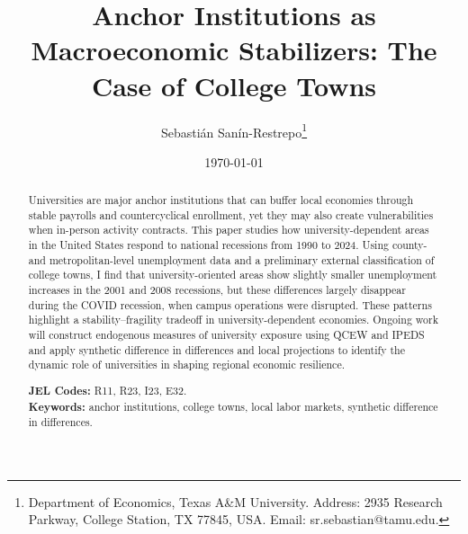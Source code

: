


\title{\Large \textbf{Anchor Institutions as Macroeconomic Stabilizers: The Case of College Towns}}

\author{Sebasti\'an San\'in-Restrepo\thanks{Department of Economics, Texas A\&M University. Address: 2935 Research Parkway, College Station, TX 77845, USA. Email: sr.sebastian@tamu.edu.}} 
\date{\today}

\maketitle
\thispagestyle{empty} 
\doublespacing
\thispagestyle{empty} 

\vspace{-10mm}
\renewcommand{\abstractname}{Abstract}
\begin{abstract} 
	\normalsize 
	\vspace{-5mm}
	
	\noindent Universities are major anchor institutions that can buffer local economies through stable payrolls and countercyclical enrollment, yet they may also create vulnerabilities when in-person activity contracts. This paper studies how university-dependent areas in the United States respond to national recessions from 1990 to 2024. Using county- and metropolitan-level unemployment data and a preliminary external classification of college towns, I find that university-oriented areas show slightly smaller unemployment increases in the 2001 and 2008 recessions, but these differences largely disappear during the COVID recession, when campus operations were disrupted. These patterns highlight a stability–fragility tradeoff in university-dependent economies. Ongoing work will construct endogenous measures of university exposure using QCEW and IPEDS and apply synthetic difference in differences and local projections to identify the dynamic role of universities in shaping regional economic resilience.	
	\\ 
	\vspace{-5mm}
	
	\onehalfspacing
	\noindent \textbf{JEL Codes:} R11, R23, I23, E32.\\
	\noindent \textbf{Keywords:} anchor institutions, college towns, local labor markets, synthetic difference in differences.
\end{abstract}

\pagebreak
{}

\doublespacing

